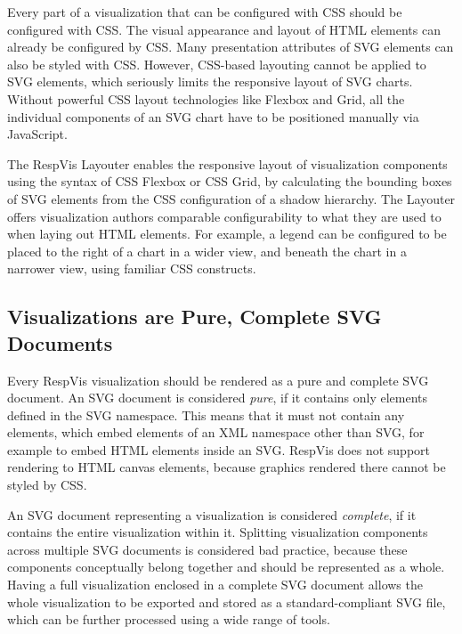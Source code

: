 Every part of a visualization that can be configured with CSS should
be configured with CSS. The visual appearance and layout of HTML
elements can already be configured by CSS. Many presentation
attributes of SVG elements can also be styled with CSS. However,
CSS-based layouting cannot be applied to SVG elements, which seriously
limits the responsive layout of SVG charts. Without powerful CSS
layout technologies like Flexbox and Grid, all the individual
components of an SVG chart have to be positioned manually via
JavaScript.

The RespVis Layouter enables the responsive layout of visualization
components using the syntax of CSS Flexbox or CSS Grid, by calculating
the bounding boxes of SVG elements from the CSS configuration of a
shadow  hierarchy. The Layouter offers visualization
authors comparable configurability to what they are used to when
laying out HTML elements. For example, a legend can be configured to
be placed to the right of a chart in a wider view, and beneath the
chart in a narrower view, using familiar CSS constructs.





\subsection{Visualizations are Pure, Complete SVG Documents}

Every RespVis visualization should be rendered as a pure and complete
SVG document. An SVG document is considered \emph{pure}, if it
contains only elements defined in the SVG namespace. This means that
it must not contain any  elements, which embed
elements of an XML namespace other than SVG, for example to embed HTML
elements inside an SVG. RespVis does not support rendering to HTML
canvas elements, because graphics rendered there cannot be styled by
CSS.

An SVG document representing a visualization is considered
\emph{complete}, if it contains the entire visualization within
it. Splitting visualization components across multiple SVG documents
is considered bad practice, because these components conceptually
belong together and should be represented as a whole. Having
a full visualization enclosed in a complete SVG document allows the
whole visualization to be exported and stored as a standard-compliant
SVG file, which can be further processed using a wide range of tools.




